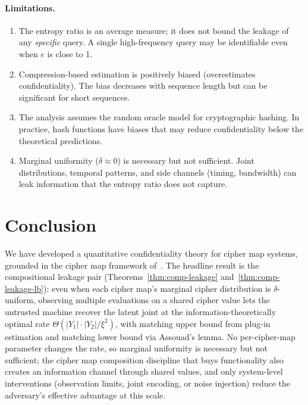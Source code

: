 \documentclass[11pt]{article}
\theoremstyle{definition}
\theoremstyle{plain}
\theoremstyle{remark}
\begin{document}
\paragraph{Limitations.}
\begin{enumerate}
\item The entropy ratio is an average measure; it does not bound the
  leakage of any \emph{specific} query.  A single high-frequency query
  may be identifiable even when $e$ is close to 1.

\item Compression-based estimation is positively biased (overestimates
  confidentiality).  The bias decreases with sequence length but can be
  significant for short sequences.

\item The analysis assumes the random oracle model for cryptographic
  hashing.  In practice, hash functions have biases that may reduce
  confidentiality below the theoretical predictions.

\item Marginal uniformity ($\delta \approx 0$) is necessary but not
  sufficient.  Joint distributions, temporal patterns, and side channels
  (timing, bandwidth) can leak information that the entropy ratio does
  not capture.
\end{enumerate}


\section{Conclusion}
\label{sec:conclusion}

We have developed a quantitative confidentiality theory for cipher map
systems, grounded in the cipher map framework
of~\cite{towell2026cipher}.  The headline result is the compositional
leakage pair (Theorems~\ref{thm:comp-leakage}
and~\ref{thm:comp-leakage-lb}): even when each cipher map's marginal
cipher distribution is $\delta$-uniform, observing multiple
evaluations on a shared cipher value lets the untrusted machine
recover the latent joint at the information-theoretically optimal
rate $\Theta(|Y_1|\cdot|Y_2|/\xi^2)$, with matching upper bound from
plug-in estimation and matching lower bound via Assouad's lemma.
No per-cipher-map parameter changes the rate, so marginal
uniformity is necessary but not sufficient; the cipher map composition
discipline that buys functionality also creates an information
channel through shared values, and only system-level interventions
(observation limits, joint encoding, or noise injection) reduce the
adversary's effective advantage at this scale.
\end{document}
